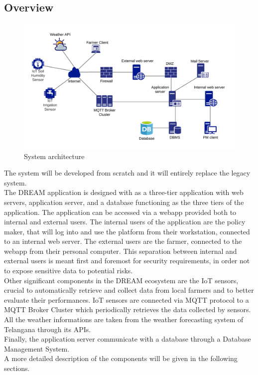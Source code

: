 \documentclass[10pt]{article} %
\begin{document}
\subsection{Overview}
\begin{figure}[h]
    \centering
    \centerline{\includegraphics[scale=0.9]{images/overview_architecture.png}}
    \caption{System architecture}
    \label{fig:overview}
\end{figure}
The system will be developed from scratch and it will entirely replace the legacy system.\\
The DREAM application is designed with as a three-tier application with web servers, application server, and a database functioning as the three tiers of the application.
The application can be accessed via a webapp provided both to internal and external users. The internal users of the application are the policy maker, that will log into and use the platform
from their workstation, connected to an internal web server. The external users are the farmer, connected to the webapp from their personal computer. This separation between internal and external 
users is meant first and foremost for security requirements, in order not to expose sensitive data to potential risks.\\
Other significant components in the DREAM ecosystem are the IoT sensors, crucial to automatically retrieve and collect data from local farmers and to better evaluate their performances.
IoT sensors are connected via MQTT protocol to a MQTT Broker Cluster which periodically retrieves the data collected by sensors.\\
All the weather informations are taken from the weather forecasting system of Telangana through its APIs.\\
Finally, the application server communicate with a database through a Database Management System.\\
A more detailed description of the components will be given in the following sections.
\end{document}
